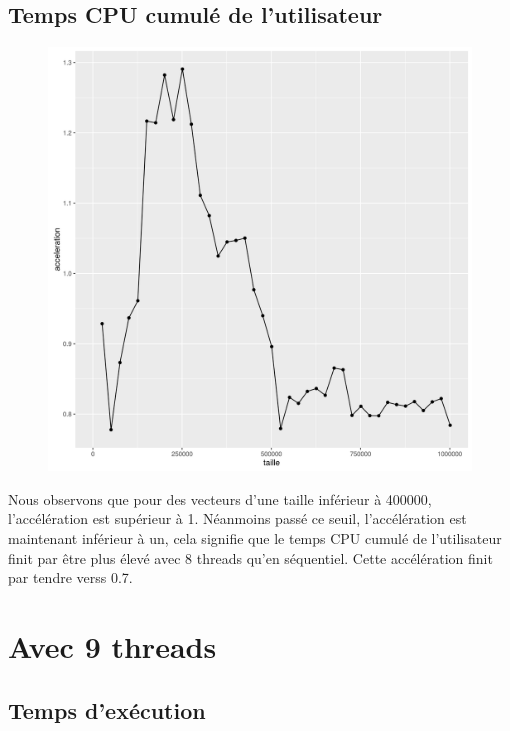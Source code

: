 \documentclass[a4paper,11pt]{scrartcl}
\begin{document}
\subsection{Temps CPU cumul\'e de l'utilisateur}
\begin{figure}[H] \center
   \includegraphics[scale=0.5] {graphes/temps_user_accel8.png}
\end{figure}
Nous observons que pour des vecteurs d'une taille inf\'erieur \`a 400000, l'acc\'el\'eration est sup\'erieur \`a 1. N\'eanmoins pass\'e ce seuil,  l'acc\'el\'eration est maintenant inf\'erieur \`a un, cela signifie que le temps CPU cumul\'e de l'utilisateur finit par \^{e}tre plus \'elev\'e avec 8 threads qu'en s\'equentiel. Cette acc\'el\'eration finit par tendre verss 0.7.


\section{Avec 9 threads}
\subsection{Temps d'ex\'ecution}
\end{document}
